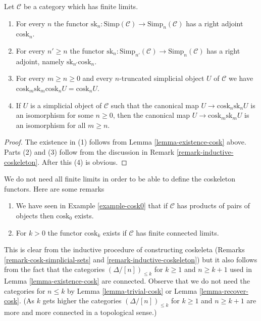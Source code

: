 \begin{lemma}
\label{lemma-cosk-up}
Let $\mathcal{C}$ be a category which has finite limits.
\begin{enumerate}
\item For every $n$ the functor $\text{sk}_n : \text{Simp}(\mathcal{C})
\to \text{Simp}_n(\mathcal{C})$ has a right adjoint $\text{cosk}_n$.
\item For every $n' \geq n$ the functor
$\text{sk}_n : \text{Simp}_{n'}(\mathcal{C}) \to \text{Simp}_n(\mathcal{C})$
has a right adjoint, namely $\text{sk}_{n'}\text{cosk}_n$.
\item For every $m \geq n \geq 0$ and every $n$-truncated simplicial
object $U$ of $\mathcal{C}$ we have
$\text{cosk}_m \text{sk}_m \text{cosk}_n U = \text{cosk}_n U$.
\item If $U$ is a simplicial object of $\mathcal{C}$ such that
the canonical map
$U \to \text{cosk}_n \text{sk}_nU$
is an isomorphism for some $n \geq 0$, then the canonical map
$U \to \text{cosk}_m \text{sk}_mU$
is an isomorphism for all $m \geq n$.
\end{enumerate}
\end{lemma}

\begin{proof}
The existence in (1) follows from Lemma \ref{lemma-existence-cosk} above.
Parts (2) and (3) follow from the discussion
in Remark \ref{remark-inductive-coskeleton}. After this (4) is obvious.
\end{proof}

\begin{remark}
\label{remark-existence-cosk}
We do not need all finite limits in order to be able to define
the coskeleton functors. Here are some remarks
\begin{enumerate}
\item We have seen in Example \ref{example-cosk0} that if $\mathcal{C}$
has products of pairs of objects then $\text{cosk}_0$ exists.
\item For $k > 0$ the functor $\text{cosk}_k$ exists if
$\mathcal{C}$ has finite connected limits.
\end{enumerate}
This is clear from the inductive procedure of constructing coskeleta
(Remarks \ref{remark-cosk-simplicial-sets} and
\ref{remark-inductive-coskeleton}) but it also follows from the fact that
the categories $(\Delta/[n])_{\leq k}$ for $k \geq 1$ and
$n \geq k + 1$ used in Lemma \ref{lemma-existence-cosk}
are connected. Observe that we do not need the categories
for $n \leq k$ by Lemma \ref{lemma-trivial-cosk} or
Lemma \ref{lemma-recover-cosk}. (As $k$ gets higher the categories
$(\Delta/[n])_{\leq k}$ for $k \geq 1$ and $n \geq k + 1$ are more
and more connected in a topological sense.)
\end{remark}

